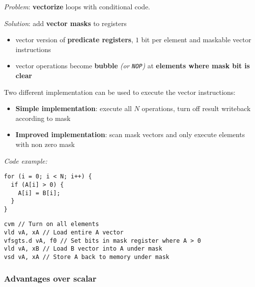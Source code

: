 \documentclass[english]{article}
\begin{document}
\textit{Problem}: \textbf{vectorize} loops with conditional code.

\textit{Solution}: add \textbf{vector masks} to registers

\begin{itemize}
  \item vector version of \textbf{predicate registers}, \(1\) bit per element and maskable vector instructions
  \item vector operations become \textbf{bubble} \textit{(or \texttt{NOP})} at \textbf{elements where mask bit is clear}
\end{itemize}

Two different implementation can be used to execute the vector instructions:

\begin{itemize}
  \item \textbf{Simple implementation}: execute all \(N\) operations, turn off result writeback according to mask
  \item \textbf{Improved implementation}: scan mask vectors and only execute elements with non zero mask
\end{itemize}

\begin{minipage}{\textwidth}
  \bigskip
  \textit{Code example:}
  \bigskip

  \begin{minipage}{\textwidth}
    \begin{minipage}[t]{0.3\textwidth}
      \begin{verbatim}
for (i = 0; i < N; i++) {
  if (A[i] > 0) {
    A[i] = B[i];
  }
}
    \end{verbatim}
    \end{minipage}
    \begin{minipage}[t]{0.695\textwidth}
      \begin{verbatim}
cvm // Turn on all elements
vld vA, xA // Load entire A vector
vfsgts.d vA, f0 // Set bits in mask register where A > 0
vld vA, xB // Load B vector into A under mask
vsd vA, xA // Store A back to memory under mask
    \end{verbatim}
    \end{minipage}
  \end{minipage}
\end{minipage}

\subsubsection{Advantages over scalar}
\end{document}
